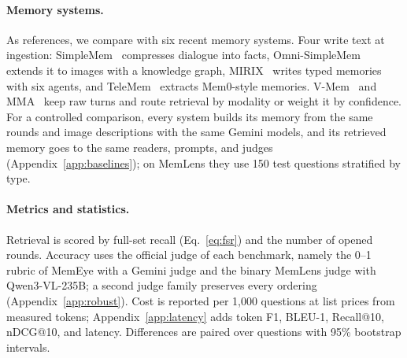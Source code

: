 \paragraph{Memory systems.} As references, we compare with six recent memory systems. Four write text at ingestion: SimpleMem~\citep{liu2026simplemem} compresses dialogue into facts, Omni-SimpleMem~\citep{liu2026omnisimplemem} extends it to images with a knowledge graph, MIRIX~\citep{wang2025mirix} writes typed memories with six agents, and TeleMem~\citep{chen2026telemem} extracts Mem0-style memories. V-Mem~\citep{kang2026vmem} and MMA~\citep{lu2026mma} keep raw turns and route retrieval by modality or weight it by confidence. For a controlled comparison, every system builds its memory from the same rounds and image descriptions with the same Gemini models, and its retrieved memory goes to the same readers, prompts, and judges (Appendix~\ref{app:baselines}); on MemLens they use 150 test questions stratified by type.

\paragraph{Metrics and statistics.} Retrieval is scored by full-set recall (Eq.~\ref{eq:fsr}) and the number of opened rounds. Accuracy uses the official judge of each benchmark, namely the 0--1 rubric of MemEye with a Gemini judge and the binary MemLens judge with Qwen3-VL-235B; a second judge family preserves every ordering (Appendix~\ref{app:robust}). Cost is reported per 1,000 questions at list prices from measured tokens; Appendix~\ref{app:latency} adds token F1, BLEU-1, Recall@10, nDCG@10, and latency. Differences are paired over questions with 95\% bootstrap intervals.
